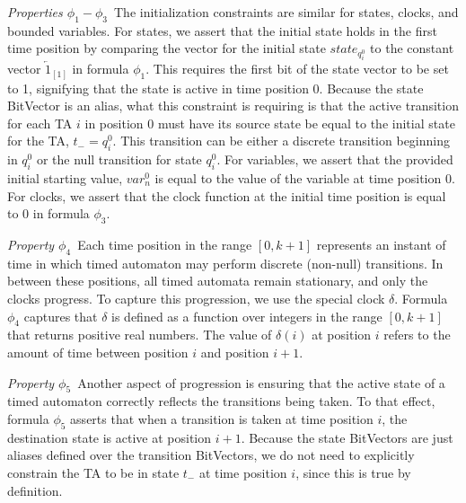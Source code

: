 \documentclass[a4paper,11pt]{report}
\theoremstyle{definition}
\begin{document}
\emph{Properties \(\phi_{1} - \phi_{3}\)}\ The initialization constraints are
similar for states, clocks, and bounded variables. For states, we assert that
the initial state holds in the first time position by comparing the vector for
the initial state \(state_{q_i^{0}}\) to the constant vector
\(\overleftarrow{1}_{[1]}\) in formula \(\phi_1\). This requires the first bit
of the state vector to be set to 1, signifying that the state is active in time
position 0. Because the state BitVector is an alias, what this constraint is
requiring is that the active transition for each TA \(i\) in position \(0\) must
have its source state be equal to the initial state for the TA,
\(t_{-} = q_{i}^{0}\). This transition can be either a discrete transition
beginning in \(q_{i}^{0}\) or the null transition for state \(q_{i}^{0}\). For
variables, we assert that the provided initial starting value, \(var_{n}^{0}\)
is equal to the value of the variable at time position 0. For clocks, we assert
that the clock function at the initial time position is equal to 0 in formula
\(\phi_3\).

\emph{Property $\phi_4$}\ Each time position in the range \([0,k+1]\) represents
an instant of time in which timed automaton may perform discrete (non-null)
transitions. In between these positions, all timed automata remain stationary,
and only the clocks progress. To capture this progression, we use the special
clock \(\delta\). Formula \(\phi_4\) captures that \(\delta\) is defined as a
function over integers in the range \([0,k+1]\) that returns positive real
numbers. The value of \(\delta(i)\) at position \(i\) refers to the amount of
time between position \(i\) and position \(i+1\).

\emph{Property $\phi_5$}\ Another aspect of progression is ensuring that the
active state of a timed automaton correctly reflects the transitions being
taken. To that effect, formula \(\phi_5\) asserts that when a transition is
taken at time position \(i\), the destination state is active at position
\(i{+}1\). Because the state BitVectors are just aliases defined over the
transition BitVectors, we do not need to explicitly constrain the TA to be in
state \(t_{-}\) at time position \(i\), since this is true by definition.
\end{document}

